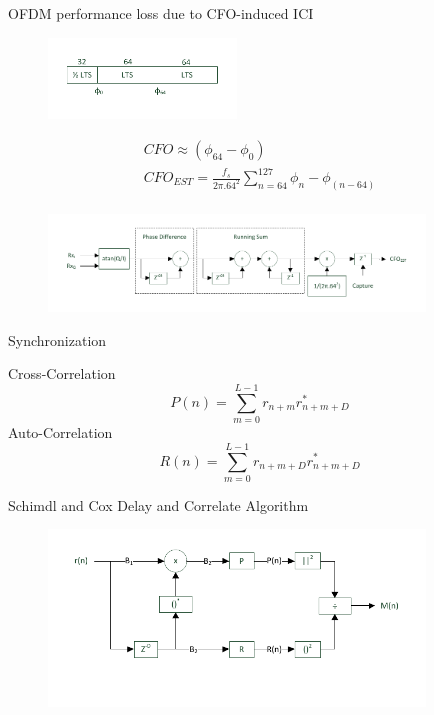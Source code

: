 \documentclass{beamer}
\begin{document}
\begin{frame}{OFDM performance loss due to CFO-induced ICI}
\begin{figure}[h!]
\centering
\includegraphics[width=5cm]{content/fig/lts_time_domain.pdf}
\end{figure}

\begin{equation}
\begin{split}
CFO \approx (\phi_{64}- \phi_{0})\\
CFO_{EST} = \frac{f_{s}}{2\pi . 64^{2}} \sum\limits_{n=64}^{127} \phi_{n}- \phi_{(n-64)}\\
\end{split}
\end{equation}

\begin{figure}[h!]
\centering
\includegraphics[width=10cm]{content/fig/time_dom_cfo_est.pdf}
\end{figure}

\end{frame}

\begin{frame}{Synchronization}

Cross-Correlation
\begin{equation} \label{P_n}
P(n) = \sum\limits_{m=0}^{L-1} r_{n+m} r^{*}_{n+m+D}
\end{equation}
Auto-Correlation
\begin{equation} \label{R_n}
 R(n) = \sum\limits_{m=0}^{L-1} r_{n+m+D} r^{*}_{n+m+D}
\end{equation}

Schimdl and Cox Delay and Correlate Algorithm
\begin{figure}[h!]
\centering
\includegraphics[width=10cm]{content/fig/schl_cox_mdl.pdf}
\end{figure}
\end{frame}
\end{document}
